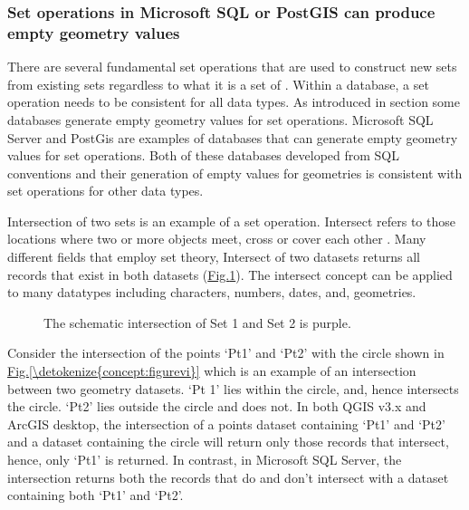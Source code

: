 \documentclass[letterpaper,11pt,english]{sphinxmanual}
\begin{document}
\subsubsection{Set operations in Microsoft SQL or PostGIS can produce empty geometry values}
\label{\detokenize{concept:set-operations-in-microsoft-sql-or-postgis-can-produce-empty-geometry-values}}
There are several fundamental set operations that are used to construct new sets from existing sets regardless to what it is a set of .  Within a database, a set operation needs to be consistent for all data types.  As introduced in section {\hyperref[\detokenize{concept:records-with-false-boolean-logic}]{}} some databases generate empty geometry values for set operations.  Microsoft SQL Server and PostGis are examples of databases that can generate empty geometry values for set operations.  Both of these databases developed from SQL conventions and their generation of empty values for geometries is consistent with set operations for other data types.

Intersection of two sets is an example of a set operation.  Intersect refers to those locations where two or more objects meet, cross or cover each other .  Many different fields that employ set theory, Intersect of two datasets returns all records that exist in both datasets (\hyperref[\detokenize{concept:figurev}]{Fig.\@ \ref{\detokenize{concept:figurev}}}).  The intersect concept can be applied to many datatypes including characters, numbers, dates, and, geometries.

\begin{figure}[htbp]
\centering
\capstart

\noindent{}
\caption{The schematic intersection of Set 1 and Set 2 is purple.}\label{\detokenize{concept:id66}}\label{\detokenize{concept:figurev}}\end{figure}

Consider the intersection of the points ‘Pt1’ and ‘Pt2’ with the circle shown in \hyperref[\detokenize{concept:figurevi}]{Fig.\@ \ref{\detokenize{concept:figurevi}}} which is an example of an intersection between two geometry datasets.  ‘Pt 1’ lies within the circle, and, hence intersects the circle.  ‘Pt2’ lies outside the circle and does not.  In both QGIS v3.x and ArcGIS desktop, the intersection of a points dataset containing ‘Pt1’ and ‘Pt2’ and a dataset containing the circle will return only those records that intersect, hence, only ‘Pt1’ is returned.  In contrast, in Microsoft SQL Server, the intersection returns both the records that do and don’t intersect with a dataset containing both ‘Pt1’ and ‘Pt2’.
\end{document}

